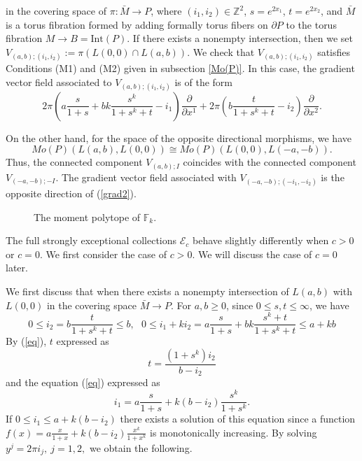 \documentclass[12pt,reqno]{amsart}
\newcommand{\Z}{{\mathbb{Z}}}
\newcommand{\F}{{\mathbb{F}}}
\newcommand{\Fk}{{\F_k}}
\newcommand{\cE}{{\mathcal{E}}}
\newcommand{\del}{{\partial}}
\newcommand{\Int}{{\mathrm{Int}}}
\theoremstyle{definition}
\begin{document}
in the covering space of $\pi:\bar{M}\to P$, where $(i_1,i_2)\in\Z^2$, $s=e^{2x_1}$, $t=e^{2x_2}$, and $\bar{M}$ is a torus fibration formed by adding formally torus fibers on $\del P$ to the torus fibration $M\to B=\Int(P)$. If there exists a nonempty intersection, then we set $V_{(a,b);(i_1,i_2)}:=\pi(L(0,0)\cap L(a,b))$. We check  that $V_{(a,b);(i_1,i_2)}$ satisfies Conditions (M1) and (M2) given in subsection \ref{Mo(P)}. In this case, the gradient vector field associated to $V_{(a,b);(i_1,i_2)}$ is of the form
\begin{equation}\label{grad2}
2\pi\left(a\frac{s}{1+s} + bk\frac{s^k}{1+s^k+t} - i_1\right)\frac{\del}{\del x^1} + 2\pi\left(b\frac{t}{1+s^k+t} - i_2 \right)\frac{\del}{\del x^2}.
\end{equation}\par
On the other hand, for the space of the opposite directional morphisms, we have
\begin{equation*}
Mo(P)(L(a,b),L(0,0)) \cong Mo(P)(L(0,0),L(-a,-b)).
\end{equation*}
Thus, the connected component $V_{(a,b);I}$ coincides with the connected component $V_{(-a,-b);-I}$. The gradient vector field associated with $V_{(-a,-b);(-i_1,-i_2)}$ is the opposite direction of (\ref{grad2}).\par
\begin{figure}[h]
\center
{}
\caption{The moment polytope of $\Fk$.}
\label{poly2}
\end{figure}

The full strongly exceptional collections $\cE_c$ behave slightly differently when $c>0$ or $c=0$. We first consider the case of $c>0$. We will discuss the case of $c=0$ later.\par
We first discuss that when there exists a nonempty intersection of $L(a,b)$ with $L(0,0)$ in the covering space $\bar{M}\to P$. For $a,b\geq0$, since $0\leq s,t\leq\infty$, we have
\begin{equation*}
0\leq i_2=b\frac{t}{1+s^k+t}\leq b,\ \ \ 0\leq i_1+ki_2 = a\frac{s}{1+s} + bk\frac{s^k+t}{1+s^k+t}\leq a+kb
\end{equation*}
By (\ref{eq}), $t$ expressed as
\begin{equation*}
t = \frac{(1+s^k)i_2}{b-i_2}
\end{equation*}
and the equation (\ref{eq}) expressed as
\begin{equation*}
i_1 = a\frac{s}{1+s} + k(b-i_2)\frac{s^k}{1+s^k}.
\end{equation*}
If $0\leq i_1\leq a+k(b-i_2)$ there exists a solution of this equation since a function $f(x)=a\frac{x}{1+x} + k(b-i_2)\frac{x^k}{1+x^k}$ is monotonically increasing. By solving $y^j=2\pi i_j,\ j=1,2,$ we obtain the following.
\end{document}
